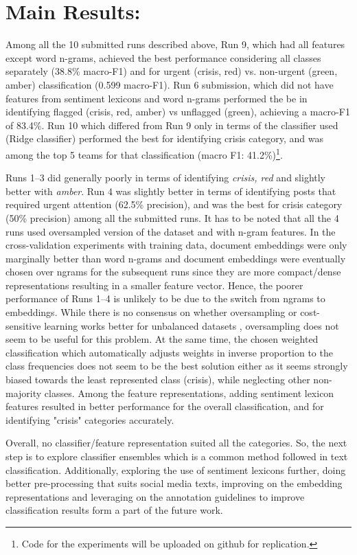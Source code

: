 \documentclass{article}
\begin{document}
\section{Main Results:}
Among all the 10 submitted runs described above, Run 9, which had all features except word n-grams, achieved the best performance considering all classes separately (38.8\% macro-F1) and for urgent (crisis, red) vs. non-urgent (green, amber) classification (0.599 macro-F1).  Run 6 submission, which did not have features from sentiment lexicons and word n-grams performed the be in identifying flagged (crisis, red, amber) vs unflagged (green), achieving a macro-F1 of 83.4\%. Run 10 which differed from Run 9 only in terms of the classifier used (Ridge classifier) performed the best for identifying crisis category, and was among the top 5 teams for that classification (macro F1: 41.2\%)\footnote{Code for the experiments will be uploaded on github for replication.}.  

Runs 1--3 did generally poorly in terms of identifying \textit{crisis, red} and slightly better with \textit{amber}. Run 4 was slightly better in terms of identifying posts that required urgent attention (62.5\% precision), and was the best for crisis category (50\% precision) among all the submitted runs. It has to be noted that all the 4 runs used oversampled version of the dataset and with n-gram features. In the cross-validation experiments with training data, document embeddings were only marginally better than word n-grams and document embeddings were eventually chosen over ngrams for the subsequent runs since they are more compact/dense representations resulting in a smaller feature vector. Hence, the poorer performance of Runs 1--4 is unlikely to be due to the switch from ngrams to embeddings. While there is no consensus on whether oversampling or cost-sensitive learning works better for unbalanced datasets  \cite[for example]{Weiss.McCarthy.ea-07,Wallace.Small.ea-11}, oversampling does not seem to be useful for this problem. At the same time, the chosen weighted classification which automatically adjusts weights in inverse proportion to the class frequencies does not seem to be the best solution either as it seems strongly biased towards the least represented class (crisis), while neglecting other non-majority classes. Among the feature representations, adding sentiment lexicon features resulted in better performance for the overall classification, and for identifying "crisis" categories accurately. 

Overall, no classifier/feature representation suited all the categories. So, the next step is to explore classifier ensembles which is a common method followed in text classification. Additionally, exploring the use of sentiment lexicons further, doing better pre-processing that suits social media texts, improving on the embedding representations and leveraging on the annotation guidelines to improve classification results form a part of the future work.



\end{document}
